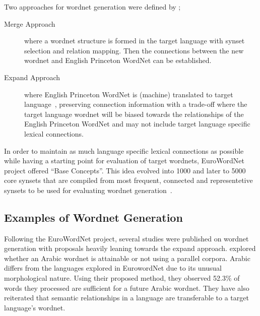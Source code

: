 Two approaches for wordnet generation were defined by ;
\begin{description}
    \item[Merge Approach] where a wordnet structure is formed in the target language with synset selection and relation mapping. Then the connections between the new wordnet and English Princeton WordNet can be established.
    \item[Expand Approach] where English Princeton WordNet is (machine) translated to target language~\cite{knight_building_1994}, preserving connection information with a trade-off where the target language wordnet will be biased towards the relationships of the English Princeton WordNet and may not include target language specific lexical connections.
\end{description}

In order to maintain as much language specific lexical connections as possible while having a starting point for evaluation of target wordnets, EuroWordNet project offered \enquote{Base Concepts}.
This idea evolved into 1000 and later to 5000 core synsets that are compiled from most frequent, connected and representetive synsets to be used for evaluating wordnet generation~\cite{boyd-graber_adding_2006}.

\subsection{Examples of Wordnet Generation}%
\label{sub:examples_of_wordnet_generation}

Following the EuroWordNet project, several studies were published on wordnet generation with proposals heavily leaning towards the expand approach.
\textcite{diabFeasibility2004} explored whether an Arabic wordnet is attainable or not using a parallel corpora.
Arabic differs from the languages explored in EurowordNet due to its unusual morphological nature.
Using their proposed method, they observed 52.3\% of words they processed are sufficient for a future Arabic wordnet.
They have also reiterated that semantic relationships in a language are transferable to a target language's wordnet.

